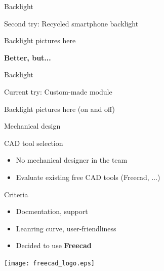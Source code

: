 \documentclass[compress,red]{beamer}
\begin{document}
\begin{frame}{Backlight}

  Second try: Recycled smartphone backlight

  \begin{center}
    Backlight pictures here
  \end{center}

  \textbf{Better, but...}


\end{frame}

\begin{frame}{Backlight}

  Current try: Custom-made module

  \begin{center}
    Backlight pictures here (on and off)
  \end{center}


\end{frame}

\begin{frame}{Mechanical design}

  CAD tool selection

  \begin{itemize}
  \item No mechanical designer in the team
  \item Evaluate existing free CAD tools (Freecad, ...)
  \end{itemize}

  Criteria

  \begin{itemize}
  \item Docmentation, support
  \item Leanring curve, user-friendliness
  \end{itemize}

  \begin{itemize}
  \item Decided to use \textbf{Freecad}
  \end{itemize}

  \begin{center}
    \texttt{[image: freecad\_logo.eps]}
  \end{center}


\end{frame}
\end{document}
